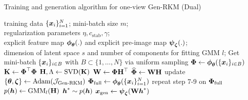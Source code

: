 \begin{algorithm}[H]
\caption{Training and generation algorithm for one-view Gen-RKM (Dual) \cite{pandeyGenerativeRestrictedKernel2021}}
\label{alg-gen-rkm-dual}
\begin{algorithmic}[1]
\Require training data $\{\boldsymbol{x}_i\}_{i=1}^{N}$; mini-batch size $m$; \\
regularization parameters $\eta, c_{\text{stab}}, \gamma$; \\
explicit feature map $\boldsymbol{\phi}_{\boldsymbol{\theta}}(.)$ and explicit pre-image map $\boldsymbol{\psi}_{\boldsymbol{\zeta}}(.)$; \\
dimension of latent space $s$ and number of components for fitting GMM $l$;
        \State Get mini-batch $\{\boldsymbol{x}_i\}_{i\in B}$ with $B \subset\{1,\dots,N\}$ via uniform sampling
        \State $\boldsymbol{\Phi} \gets \boldsymbol{\phi}_{\boldsymbol{\theta}}(\{\boldsymbol{x}_i\}_{i\in B})$ 
        \State $\mathbf{K} \gets \boldsymbol{\Phi}^\top\boldsymbol{\Phi}$
        \State $\mathbf{H},\Lambda \gets \text{SVD}(\mathbf{K})$ 
        \State $\mathbf{W}\gets \boldsymbol{\Phi}\mathbf{H}^\top$
        \State $\widehat{\boldsymbol{\Phi}} \gets \mathbf{W} \mathbf{H}$
        \State update $\{\boldsymbol{\theta},\boldsymbol{\zeta}\} \gets \text{Adam}(\mathcal{J}_\text{Gen-RKM})$ 
        \EndFor
    \EndFor
{}
\State $\boldsymbol{\Phi}_{\text{full}} \gets \boldsymbol{\phi}_{\boldsymbol{\theta}}(\{\boldsymbol{x}_i\}_{i=1}^{N})$
\State repeat step 7-9 on $\boldsymbol{\Phi}_{\text{full}}$
\EndProcedure
{}
\State $p(\boldsymbol{h}) \gets \text{GMM}_{l}(\mathbf{H})$
\State $\boldsymbol{h}^* \sim p(\boldsymbol{h})$  
\State $\boldsymbol{x}_{\text{gen}} \gets \boldsymbol{\psi}_{\boldsymbol{\zeta}}(\mathbf{W} \boldsymbol{h}^{*})$
\EndProcedure

\end{algorithmic}
\end{algorithm}